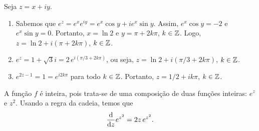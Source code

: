 
\begin{questions}

\setcounter{question}{1}
\begin{solution}
Seja $z = x+iy$.
    \begin{enumerate}[label=(\alph*)]
      \item Sabemos que
      $
          e^z = e^x e^{iy} = e^x \cos y + i e^x \sin y.
      $
      Assim, $e^x \cos y = -2$ e $e^x \sin y = 0$.
      Portanto, $x = \ln 2$ e $y = \pi + 2k\pi$, $k\in{\mathbb Z}$. Logo, $z = \ln 2 + i(\pi + 2k\pi)$, $k\in{\mathbb Z}$.
      
      \item $\displaystyle e^z = 1 + \sqrt{3}i = 2\,e^{i(\pi/3 + 2k\pi)}$, ou seja, $z = \ln 2 + i(\pi/3 + 2k\pi)$, $k\in{\mathbb Z}$.
      
      \item $\displaystyle e^{2z - 1} = 1 = e^{i 2k\pi}$ para todo $k\in{\mathbb Z}$. Portanto, $z = 1/2 + ik\pi$, $k\in{\mathbb Z}$.
    \end{enumerate}
\end{solution}

\begin{solution}
    A função $f$ é inteira, pois trata-se de uma composição de duas funções inteiras: $e^z$ e $z^2$. Usando a regra da cadeia, temos que
    \begin{align*}
        \frac{\mathrm{d}}{\mathrm{d} z}e^{z^2} = 2z\,e^{z^2}.
    \end{align*}
\end{solution}



\end{questions}
